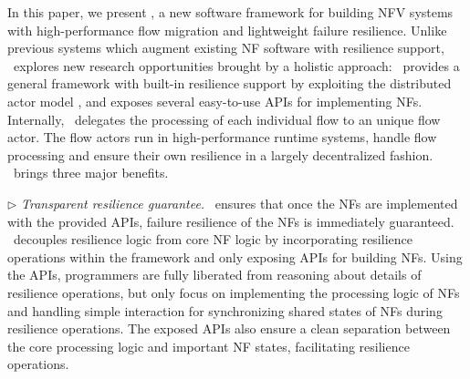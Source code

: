 


In this paper, we present \nfactor, a new software framework for building NFV systems with high-performance flow migration and lightweight failure resilience. Unlike previous systems \cite{sherry2015rollback, rajagopalan2013pico, rajagopalan2013split, gember2015opennf} which augment existing NF software with resilience support, \nfactor~explores new research opportunities brought by a holistic approach: \nfactor~provides a general framework with built-in resilience support by exploiting the distributed actor model \cite{actor-wiki}, and exposes several easy-to-use APIs for implementing NFs. Internally, \nfactor~delegates the processing of each individual flow to an unique flow actor. The flow actors run in high-performance runtime systems, handle flow processing and ensure their own resilience in a largely decentralized fashion. \nfactor~brings three major benefits.

$\triangleright$ {\em Transparent resilience guarantee.} \nfactor~ensures that once the NFs are implemented with the provided APIs, failure resilience of the NFs is immediately guaranteed. \nfactor~decouples resilience logic from core NF logic by incorporating resilience operations within the framework and only exposing APIs for building NFs. Using the APIs, programmers are fully liberated from reasoning about details of resilience operations, but only focus on implementing the processing logic of NFs and handling simple interaction for synchronizing shared states of NFs during resilience operations. The exposed APIs also ensure a clean separation between the core processing logic and important NF states, facilitating resilience operations.

